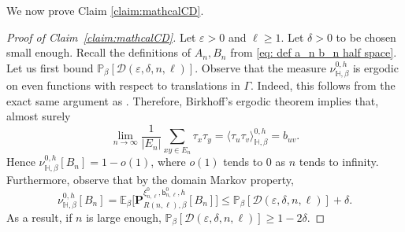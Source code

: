 \documentclass[11pt,a4paper]{article}
\numberwithin{equation}{section}
\theoremstyle{plain}
\theoremstyle{definition}
\begin{document}
We now prove Claim \ref{claim:mathcalCD}.
\begin{proof}[Proof of Claim~\textup{\ref{claim:mathcalCD}}] Let $\varepsilon>0$ and $\ell\geq 1$. Let $\delta>0$ to be chosen small enough. Recall the definitions of $A_n,B_n$ from \eqref{eq: def a_n b_n half space}.
Let us first bound $\mathbb P_\beta[\mathcal D(\varepsilon,\delta,n,\ell)]$. Observe that the measure $\nu^{0,h}_{\mathbb H,\beta}$ is ergodic on even functions with respect to translations in $\Gamma$. Indeed, this follows from the exact same argument as \cite[Proposition~2.10]{GunaratnamPanagiotisPanisSeveroPhi42022}. Therefore, Birkhoff's ergodic theorem implies that, almost surely
\begin{equation}
\lim_{n \rightarrow \infty} \frac{1}{|E_n|} \sum_{xy \in E_n} \tau_x \tau_y = \langle \tau_u\tau_v\rangle^{0,h}_{\mathbb H,\beta}= b_{uv}. 
\end{equation}
Hence $\nu^{0,h}_{\mathbb H, \beta}[B_n]=1-o(1)$, where $o(1)$ tends to $0$ as $n$ tends to infinity. Furthermore, observe that by the domain Markov property,
\begin{equation}
\nu^{0,h}_{\mathbb H, \beta}[B_n] = \mathbb E_\beta\Big[\mathbf P^{\xi^0_{n,\ell}, \mathsf b^0_{n,\ell},h}_{R(n,\ell),\beta}[B_n]\Big]\leq \mathbb P_\beta[\mathcal D(\varepsilon,\delta,n,\ell)] + \delta. 
\end{equation}
As a result, if $n$ is large enough, $\mathbb P_\beta[\mathcal{D}(\varepsilon,\delta,n,\ell)]\geq 1-2\delta$.


\end{proof}
\end{document}
